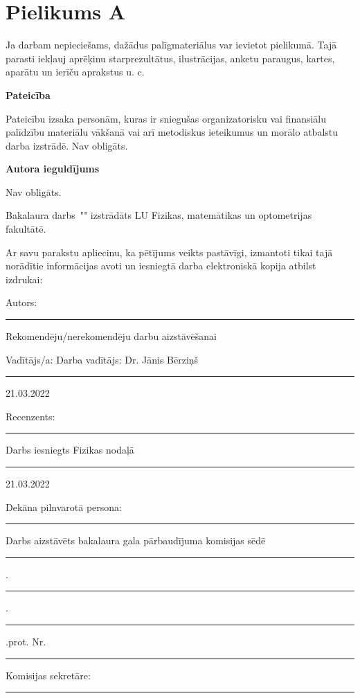\documentclass[12pt]{report}%
\theoremstyle{definition}
\def\degree{Bakalaura darbs}
\def\supervisor{Darba vadītājs: Dr. Jānis Bērziņš}
\newcommand{\thedate}[0]{21.03.2022}%
\begin{document}
\cleardoublepage
{}
{}
\printbibliography

\newpage
\chapter*{Pielikums A}

Ja darbam nepieciešams, dažādus palīgmateriālus var ievietot pielikumā. Tajā
parasti iekļauj aprēķinu starprezultātus, ilustrācijas, anketu paraugus, kartes, aparātu un ierīču
aprakstus u. c.



\newpage

\thispagestyle{empty}

\begin{center}
     \textbf{\LARGE Pateicība}
\end{center}

Pateicību izsaka personām, kuras ir sniegušas organizatorisku vai finansiālu
palīdzību materiālu vākšanā vai arī metodiskus ieteikumus un morālo atbalstu darba izstrādē. Nav obligāts.

\newpage


\thispagestyle{empty}

\begin{center}
     \textbf{\LARGE Autora ieguldījums}
\end{center}

Nav obligāts.


\newpage
\thispagestyle{empty}
\makeatletter
{
\degree \ "\@title" izstrādāts LU Fizikas, matemātikas un optometrijas fakultātē.
    
    
\vspace{10mm}
Ar savu parakstu apliecinu, ka pētījums veikts pastāvīgi, izmantoti tikai tajā norādītie informācijas avoti un iesniegtā darba elektroniskā kopija atbilst izdrukai:

Autors: \rule{30mm}{0.2mm} \@author
    
\vspace{20mm}
Rekomendēju/nerekomendēju darbu aizstāvēšanai

Vadītājs/a: \supervisor \ \rule{30mm}{0.2mm} \thedate
   
\vspace{20mm}
\noindent Recenzents: \rule{60mm}{0.2mm}

\vspace{20mm}
Darbs iesniegts Fizikas nodaļā \rule{35mm}{0.2mm} \thedate

Dekāna pilnvarotā persona: \rule{60mm}{0.2mm}

\vspace{20mm}

Darbs aizstāvēts bakalaura gala pārbaudījuma komisijas sēdē

\rule{7mm}{0.2mm}.\rule{7mm}{0.2mm}.\rule{14mm}{0.2mm} .prot. Nr. \rule{7mm}{0.2mm}

Komisijas sekretāre: \rule{60mm}{0.2mm}

}
\makeatother
\end{document}
